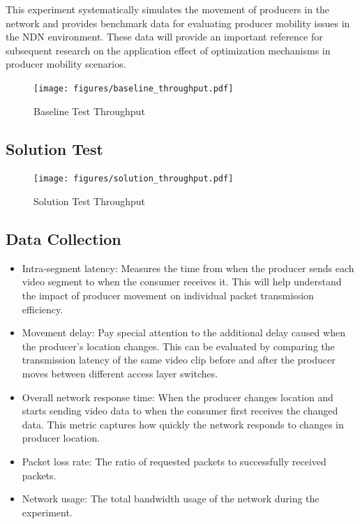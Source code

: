 \documentclass[conference]{IEEEtran}
\begin{document}
This experiment systematically simulates the movement of producers in the network and provides benchmark data for evaluating producer mobility issues in the NDN environment. These data will provide an important reference for subsequent research on the application effect of optimization mechanisms in producer mobility scenarios.

\begin{figure}
    \centering
    \texttt{[image: figures/baseline\_throughput.pdf]} %
    \caption{Baseline Test Throughput}
    \label{fig:baseline-throughput}
\end{figure}

\subsection{Solution Test}
\begin{figure}
    \centering
    \texttt{[image: figures/solution\_throughput.pdf]} %
    \caption{Solution Test Throughput}
    \label{fig:solution-throughput}
\end{figure}

\subsection{Data Collection}
\begin{itemize}
    \item Intra-segment latency: Measures the time from when the producer sends each video segment to when the consumer receives it. This will help understand the impact of producer movement on individual packet transmission efficiency.
    \item Movement delay: Pay special attention to the additional delay caused when the producer's location changes. This can be evaluated by comparing the transmission latency of the same video clip before and after the producer moves between different access layer switches.
    \item Overall network response time: When the producer changes location and starts sending video data to when the consumer first receives the changed data. This metric captures how quickly the network responds to changes in producer location.
    \item Packet loss rate: The ratio of requested packets to successfully received packets.
    \item Network usage: The total bandwidth usage of the network during the experiment.
\end{itemize}
\end{document}
